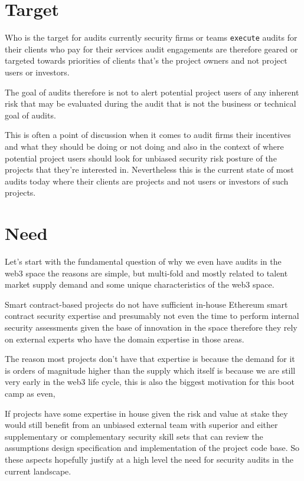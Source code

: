 \section{Target}

Who is the target for audits currently security firms or teams \verb|execute| audits for their clients who pay for their services audit engagements are therefore geared or targeted towards priorities of clients that's the project owners and not project users or investors.

The goal of audits therefore is not to alert potential project users of any inherent risk that may be evaluated during the audit that is not the business or technical goal of audits. 

This is often a point of discussion when it comes to audit firms their incentives and what they should be doing or not doing and also in the context of where potential project users should look for unbiased security risk posture of the projects that they're interested in. Nevertheless this is the current state of most audits today where their clients are projects and not users or investors of such projects.

\section{Need}

Let's start with the fundamental question of why we even have audits in the web3 space the reasons are simple, but multi-fold and mostly related to talent market supply demand and some unique characteristics of the web3 space. 

Smart contract-based projects do not have sufficient in-house Ethereum smart contract security expertise and presumably not even the time to perform internal security assessments given the base of innovation in the space therefore they rely on external experts who have the domain expertise in those areas. 

The reason most projects don't have that expertise is because the demand for it is orders of magnitude higher than the supply which itself is because we are still very early in the web3 life cycle, this is also the biggest motivation for this boot camp as even, 

If projects have some expertise in house given the risk and value at stake they would still benefit from an unbiased external team with superior and either supplementary or complementary security skill sets that can review the assumptions design specification and implementation of the project code base. So these aspects hopefully justify at a high level the need for security audits in the current landscape.

